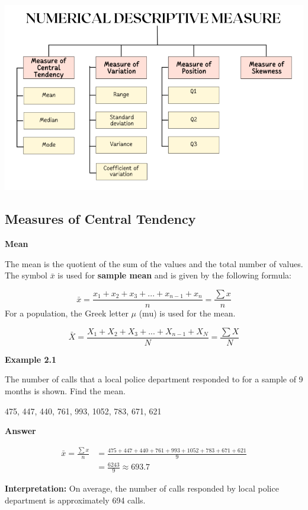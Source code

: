 \documentclass[
  a4paper,
  DIV=11,
  numbers=noendperiod,
  oneside]{scrreprt}
\begin{document}
\includegraphics[width=6.25in,height=\textheight]{images/ch2/picture9.png}

\hypertarget{measures-of-central-tendency}{%
\subsection{Measures of Central
Tendency}\label{measures-of-central-tendency}}

\textbf{Mean}

The mean is the quotient of the sum of the values and the total number
of values. The symbol \(\bar{x}\) is used for \textbf{sample mean} and
is given by the following formula:

\[
\bar{x} = \frac{x_1 + x_2 + x_3 + ... + x_{n-1} + x_n}{n} = \frac{\sum{x}}{n}
\] For a population, the Greek letter \(\mu\) (mu) is used for the mean.

\[
\bar{X} = \frac{X_1 + X_2 + X_3 + ... + X_{n-1} + X_N}{N} = \frac{\sum{X}}{N}
\]

{\textbf{Example 2.1}}

The number of calls that a local police department responded to for a
sample of 9 months is shown. Find the mean.

475, 447, 440, 761, 993, 1052, 783, 671, 621

{\textbf{Answer}}

\[
\begin{aligned}
\bar{x} = \frac{\sum{x}}{n} &= \frac{475+447+440+761+993+1052+783+671+621}{9} \\
&= \frac{6243}{9} \approx 693.7
\end{aligned}
\]

\textbf{Interpretation:} On average, the number of calls responded by
local police department is approximately 694 calls.
\end{document}
